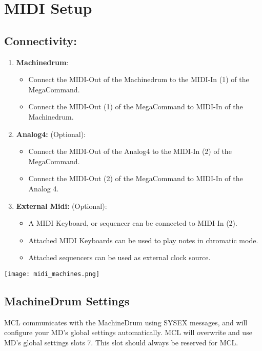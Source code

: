 \chapter{MIDI Setup}
\section{Connectivity:}

\begin{enumerate}
\item\textbf{Machinedrum}:
\begin{itemize}
    \item Connect the MIDI-Out of the Machinedrum to the MIDI-In (1) of the MegaCommand.
    \item Connect the MIDI-Out (1) of the MegaCommand to MIDI-In of the Machinedrum.
\end{itemize}

\item\textbf{Analog4:} (Optional):
\begin{itemize}
    \item Connect the MIDI-Out of the Analog4 to the MIDI-In (2) of the MegaCommand. 
    \item Connect the MIDI-Out (2) of the MegaCommand to MIDI-In of the Analog 4.
\end{itemize}

\item\textbf{External Midi:} (Optional): 
\begin{itemize}
    \item A MIDI Keyboard, or sequencer can be connected to MIDI-In (2). 
    \item Attached MIDI Keyboards can be used to play notes in chromatic mode.
    \item Attached sequencers can be used as external clock source.
\end{itemize}

\end{enumerate}
\texttt{[image: midi\_machines.png]}
\\
\newpage
\section{MachineDrum Settings }

MCL communicates with the MachineDrum using SYSEX messages, and will configure your MD's global settings automatically. MCL will overwrite and use MD's global settings slots 7. This slot should always be reserved for MCL.

